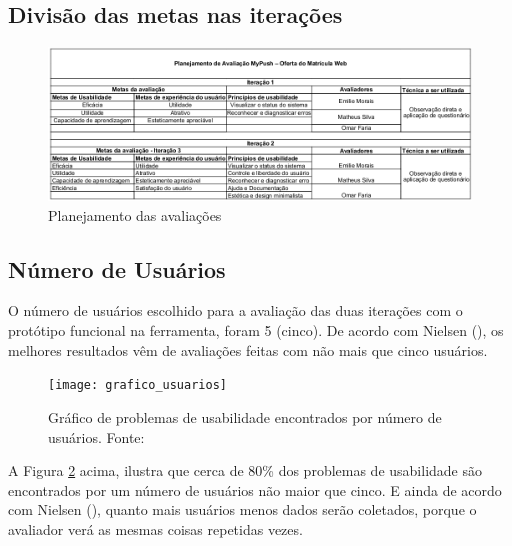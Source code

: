 \subsection{Divisão das metas nas iterações}
\begin{figure}[h!]
  \centering
    \includegraphics[keepaspectratio=true, scale=0.5]{figuras/planejamentoavaliacoes.png}
  \caption{Planejamento das avaliações}
  \label{Planejamento}
\end{figure}

% 

\subsection{Número de Usuários}

O número de usuários escolhido para a avaliação das duas iterações com o protótipo funcional na ferramenta, foram 5 (cinco). De acordo
com Nielsen (\citeyear{nielsen}), os melhores resultados vêm de avaliações feitas com não mais que cinco usuários.


\begin{figure}[!htb]
 \centering
 \texttt{[image: grafico\_usuarios]}
 \caption[Gráfico de problemas de usabilidade encontrados por número de usuários]{Gráfico de problemas de usabilidade encontrados por número de usuários. Fonte: \cite{nielsen}}
 \label{fig:grafico_usuarios}
\end{figure}

A Figura \ref{fig:grafico_usuarios} acima, ilustra que cerca de 80\% dos problemas de usabilidade são encontrados por um número de
usuários não maior que cinco. E ainda de acordo com Nielsen (\citeyear{nielsen}), quanto mais usuários menos dados serão coletados, porque
o avaliador verá as mesmas coisas repetidas vezes.

